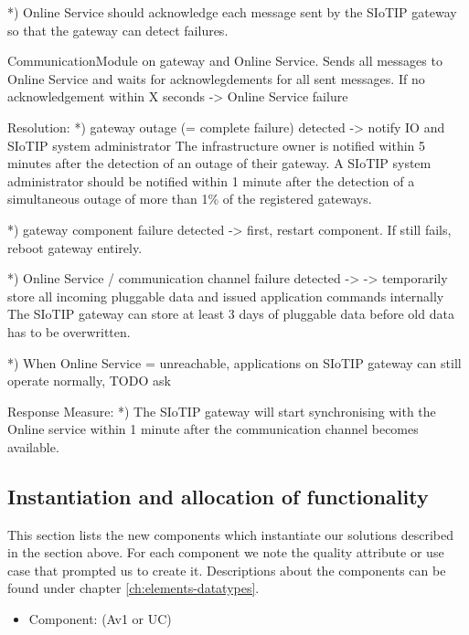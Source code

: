         *) Online Service should acknowledge each message sent by the SIoTIP
           gateway so that the gateway can detect failures.

           CommunicationModule on gateway and Online Service.
           Sends all messages to Online Service and waits for
           acknowlegdements for all sent messages. If no acknowledgement
           within X seconds -> Online Service failure

    Resolution:
        *) gateway outage (= complete failure) detected
           -> notify IO and SIoTIP system administrator
           The infrastructure owner is notified within 5 minutes after
           the detection of an outage of their gateway. A SIoTIP system administrator
           should be notified within 1 minute after the detection of a simultaneous
           outage of more than 1\% of the registered gateways.

        *) gateway component failure detected
           -> first, restart component. If still fails, reboot gateway entirely.

        *) Online Service / communication channel failure detected ->
           -> temporarily store all incoming pluggable data and issued
              application commands internally
           The SIoTIP gateway can store at least 3 days of pluggable data before
           old data has to be overwritten.

        *) When Online Service = unreachable, applications on SIoTIP gateway
           can still operate normally, TODO ask

    Response Measure:
        *) The SIoTIP gateway will start synchronising with the Online service
           within 1 minute after the communication channel becomes available.


\subsection{Instantiation and allocation of functionality}
    This section lists the new components which instantiate our solutions
    described in the section above. For each component we note the quality
    attribute or use case that prompted us to create it. Descriptions about
    the components can be found under chapter \ref{ch:elements-datatypes}. \\

    \begin{itemize}
        \item Component: (Av1 or UC)
    \end{itemize}


